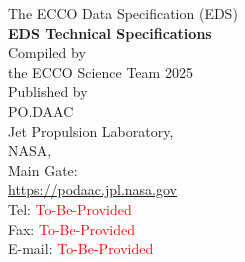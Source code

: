 \pagebreak
\begin{center}
    \vspace*{2cm}
    {\Large The ECCO Data Specification (EDS)}\\[2cm]
    {\LARGE \textbf{EDS Technical Specifications}}\\[2cm]
    {\large Compiled by\\the ECCO Science Team 2025}\\[2cm]
    {\large Published by \\PO.DAAC\\
    Jet Propulsion Laboratory,\\
    NASA,\\
    Main Gate:\\
    \url{https://podaac.jpl.nasa.gov}}\\[2cm]
    {\large Tel: \textcolor{red}{To-Be-Provided}\\
    Fax: \textcolor{red}{To-Be-Provided}\\
    E-mail: \textcolor{red}{To-Be-Provided}}\\[2cm]
\end{center}


\newpage




